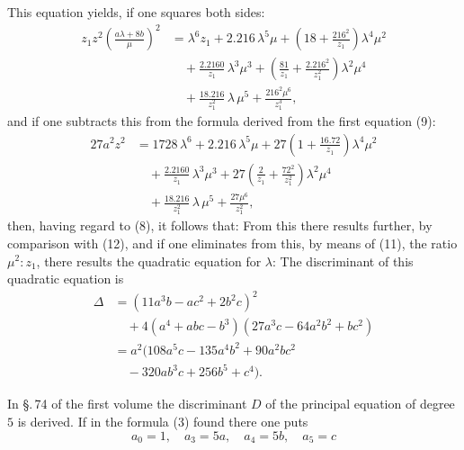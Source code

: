 This equation yields, if one squares both sides:
\[
\begin{aligned}
z_1 z^2\left(\frac{a\lambda+8b}{\mu}\right)^2 &= \lambda^6 z_1 + 2.216\,\lambda^5\mu + \left(18+\frac{216^2}{z_1}\right)\lambda^4\mu^2 \\
&\quad + \frac{2.2160}{z_1}\,\lambda^3\mu^3 + \left(\frac{81}{z_1}+\frac{2.216^2}{z_1^2}\right)\lambda^2\mu^4 \\
&\quad + \frac{18.216}{z_1^2}\,\lambda\,\mu^5 + \frac{216^2\mu^6}{z_1^3},
\end{aligned}
\]
and if one subtracts this from the formula derived from the first equation (9):
\[
\begin{aligned}
27a^2z^2 &= 1728\,\lambda^6 + 2.216\,\lambda^5\mu + 27\left(1+\frac{16.72}{z_1}\right)\lambda^4\mu^2 \\
&\quad + \frac{2.2160}{z_1}\,\lambda^3\mu^3 + 27\left(\frac{2}{z_1}+\frac{72^2}{z_1^2}\right)\lambda^2\mu^4 \\
&\quad + \frac{18.216}{z_1^2}\,\lambda\,\mu^5 + \frac{27\mu^6}{z_1^2},
\end{aligned}
\]
then, having regard to (8), it follows that:
From this there results further, by comparison with (12),
and if one eliminates from this, by means of (11), the ratio $\mu^2:z_1$, there results the quadratic equation for $\lambda$:
The discriminant of this quadratic equation is
\[
\begin{aligned}
\Delta &= (11a^3b - ac^2 + 2b^2c)^2 \\
&\quad + 4(a^4+abc-b^3)(27a^3c - 64a^2b^2 + bc^2) \\
&= a^2(108a^5c - 135a^4b^2 + 90a^2bc^2 \\
&\quad - 320ab^3c + 256b^5 + c^4).
\end{aligned}
\]

In \S.\,74 of the first volume the discriminant $D$ of the principal equation of degree $5$ is derived. If in the formula (3) found there one puts
\[
a_0=1,\quad a_3=5a,\quad a_4=5b,\quad a_5=c
\]
